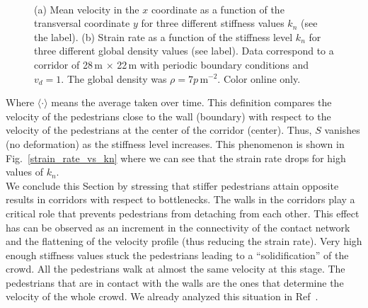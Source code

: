 \documentclass[preprint,12pt]{elsarticle}
\begin{document}
\begin{figure}[!htbp]
\centering
    \ 
    \\
\caption[width=0.47\columnwidth]{(a) Mean velocity in the $x$ coordinate as a function of the transversal coordinate $y$ for three different stiffness values $k_n$ (see the label). (b) Strain rate as a function of the stiffness level $k_n$ for three different global density values (see label). Data correspond to a corridor of 28$\,$m $\times$ 22$\,$m with periodic boundary conditions and $v_d=1$. The global density was $\rho=7 p\,$m$^{-2}$. Color online only. }
\label{profile_strain}
\end{figure}

Where $\langle \cdot \rangle$ means the average taken over time. This definition compares the velocity of the pedestrians close to the wall (boundary) with respect to the velocity of the pedestrians at the center of the corridor (center). Thus, $S$ vanishes (no deformation) as the stiffness level increases. This phenomenon is shown in Fig.~\ref{strain_rate_vs_kn} where we can see that the strain rate drops for high values of $k_n$. \\


We conclude this Section by stressing that stiffer pedestrians attain opposite results in corridors with respect to bottlenecks. The walls in the corridors play a critical role that prevents pedestrians from detaching from each other. This effect has can be observed as an increment in the connectivity of the contact network and the flattening of the velocity profile (thus reducing the strain rate). Very high enough stiffness values stuck the pedestrians leading to a ``solidification'' of the crowd. All the pedestrians walk at almost the same velocity at this stage. The pedestrians that are in contact with the walls are the ones that determine the velocity of the whole crowd. We already analyzed this situation in Ref~\cite{dorso_2019}. \\
\end{document}
